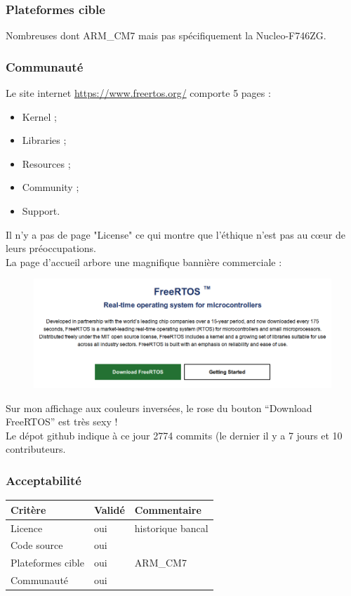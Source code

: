 \subsubsection{Plateformes cible}
Nombreuses dont ARM\_CM7 mais pas spécifiquement la Nucleo-F746ZG.


\subsubsection{Communauté}
Le site internet \url{https://www.freertos.org/} comporte 5 pages :
\begin{itemize}
	\item Kernel ;
	\item Libraries ;
	\item Resources ;
	\item Community ;
	\item Support.
\end{itemize}

Il n'y a pas de page "License" ce qui montre que l'éthique n'est pas au cœur de
leurs préoccupations.\\

La page d'accueil arbore une magnifique bannière commerciale :
\begin{figure}[!h]
	\begin{center}
		\includegraphics[scale=.5]{images/accueil_site.png}
	\end{center}
\end{figure}

Sur mon affichage aux couleurs inversées, le rose du bouton \enquote{Download
FreeRTOS} est très sexy !\\

Le dépot github indique à ce jour 2774 commits (le dernier il y a 7 jours et 10
contributeurs.

\subsubsection{Acceptabilité}
\begin{tabular}{lll}
\toprule
	Critère				&	Validé		&	Commentaire	\\
\midrule
	Licence				&	oui			&	historique bancal	\\
	Code source			&	oui			&		\\
	Plateformes cible	&	oui			&	ARM\_CM7	\\
	Communauté			&	oui			&		\\
\bottomrule
\end{tabular}

